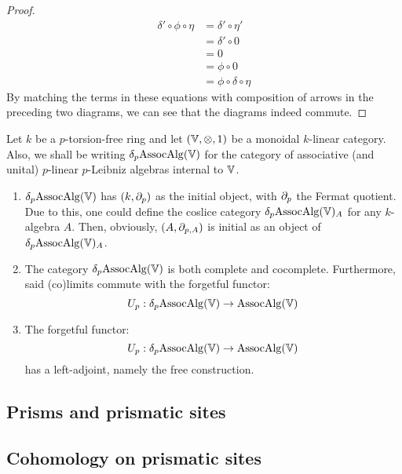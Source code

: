 \begin{proof}
                    $$
                        \begin{aligned}
                            \delta' \circ \phi \circ \eta & = \delta' \circ \eta'
                            \\
                            & = \delta' \circ 0
                            \\
                            & = 0
                            \\
                            & = \phi \circ 0
                            \\
                            & = \phi \circ \delta \circ \eta
                        \end{aligned}
                    $$
                By matching the terms in these equations with composition of arrows in the preceding two diagrams, we can see that the diagrams indeed commute.
            \end{proof}
    
        \begin{proposition}
            Let $k$ be a $p$-torsion-free ring and let $(\V, \tensor, 1)$ be a monoidal $k$-linear category. Also, we shall be writing $\delta_p\mathrm{Assoc}\mathrm{Alg}(\mathbb{V})$ for the category of associative (and unital) $p$-linear $p$-Leibniz algebras internal to $\mathbb{V}$. 
                \begin{enumerate}
                    \item $\delta_p\mathrm{Assoc}\mathrm{Alg}(\mathbb{V})$ has $(k, \partial_p)$ as the initial object, with $\partial_p$ the Fermat quotient. Due to this, one could define the coslice category $\delta_p\mathrm{Assoc}\mathrm{Alg}(\mathbb{V})_A$ for any $k$-algebra $A$. Then, obviously, $(A, \partial_{p,A})$ is initial as an object of $\delta_p\mathrm{Assoc}\mathrm{Alg}(\mathbb{V})_A$.
                    \item The category $\delta_p\mathrm{Assoc}\mathrm{Alg}(\mathbb{V})$ is both complete and cocomplete. Furthermore, said (co)limits commute with the forgetful functor:
                        $$U_p: \delta_p\mathrm{Assoc}\mathrm{Alg}(\mathbb{V}) \to \mathrm{Assoc}\mathrm{Alg}(\mathbb{V})$$
                    \item The forgetful functor:
                        $$U_p: \delta_p\mathrm{Assoc}\mathrm{Alg}(\mathbb{V}) \to \mathrm{Assoc}\mathrm{Alg}(\mathbb{V})$$
                    has a left-adjoint, namely the free construction.
                \end{enumerate}
        \end{proposition}
        
    \subsection{Prisms and prismatic sites}
        
    \subsection{Cohomology on prismatic sites}